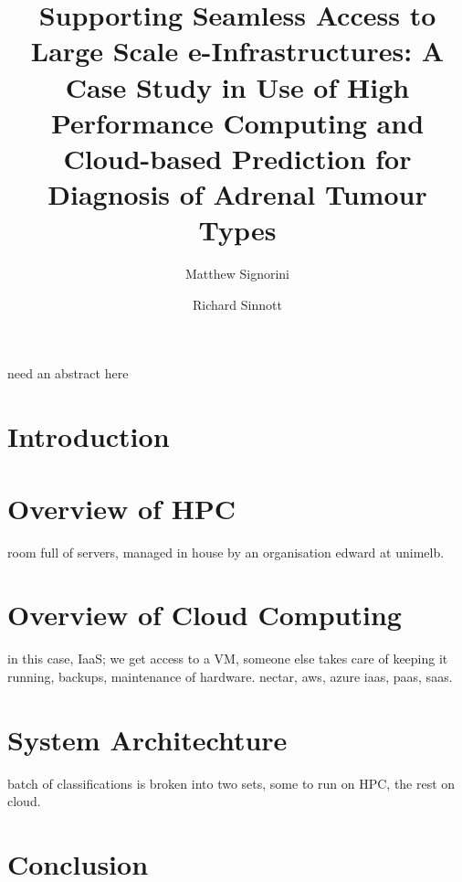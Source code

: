 \documentclass[a4paper]{article}
\title{Supporting Seamless Access to Large Scale e-Infrastructures: A Case
    Study in Use of High Performance Computing and Cloud-based Prediction
    for Diagnosis of Adrenal Tumour Types}
\author{Matthew Signorini \and Richard Sinnott}
\begin{document}
\maketitle

need an abstract here

\section{Introduction}


\section{Overview of HPC}
room full of servers, managed in house by an organisation
edward at unimelb.

\section{Overview of Cloud Computing}
in this case, IaaS; we get access to a VM, someone else takes care of
keeping it running, backups, maintenance of hardware.
nectar, aws, azure
iaas, paas, saas.

\section{System Architechture}
batch of classifications is broken into two sets, some to run on HPC, the 
rest on cloud.

\section{Conclusion}
\end{document}
